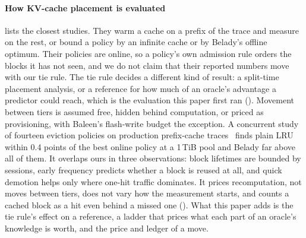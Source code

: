 \paragraph{How KV-cache placement is evaluated}  lists the closest studies. They
warm a cache on a prefix of the trace and measure on the rest, or bound a policy by an infinite cache
or by Belady's offline optimum. Their policies are online, so a policy's own admission rule orders the
blocks it has not seen, and we do not claim that their reported numbers move with our tie rule. The tie
rule decides a different kind of result: a split-time placement analysis, or a reference for how much
of an oracle's advantage a predictor could reach, which is the evaluation this paper first ran
(). Movement between tiers is assumed free, hidden behind computation, or priced
as provisioning, with Baleen's flash-write budget the exception. A concurrent study of fourteen eviction
policies on production prefix-cache traces~\cite{liu2026fancyeviction} finds plain LRU within 0.4 points
of the best online policy at a 1\,TiB pool and Belady far above all of them. It overlaps ours in three
observations: block lifetimes are bounded by sessions, early frequency predicts whether a block is reused
at all, and quick demotion helps only where one-hit traffic dominates. It prices recomputation, not moves
between tiers, does not vary how the measurement starts, and counts a cached block as a hit even behind a
missed one (). What this paper adds is the tie rule's effect
on a reference, a ladder that prices what each part of an oracle's knowledge is worth, and the price and
ledger of a move.
